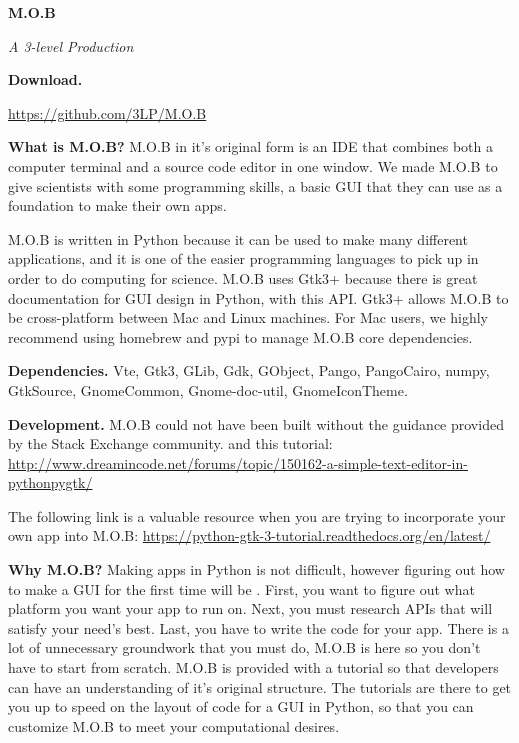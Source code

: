 \documentclass[12pt]{article}
\begin{document}
\begin{center}{\Huge{\textbf{M.O.B}}} \end{center}

\begin{center} \textit{A 3-level Production}\end{center}


\begin{multicols}{2}

\textbf{Download.}

{\footnotesize{\url{https://github.com/3LP/M.O.B}}}

\vspace{0.25cm}

\textbf{What is M.O.B?}  M.O.B in it's original form is an IDE that combines both a computer terminal and a source code editor in one window.  We made M.O.B to give scientists with some programming skills, a basic GUI that they can use as a foundation to make their own apps.

\indent M.O.B is written in Python because it can be used to make many different applications, and it is one of the easier programming languages to pick up in order to do computing for science.  M.O.B uses Gtk3+ because there is great documentation for GUI design in Python, with this API.  Gtk3+ allows M.O.B to be cross-platform between Mac and Linux machines.  For Mac users, we highly recommend using homebrew and pypi to manage M.O.B core dependencies.   


\textbf{Dependencies.} Vte, Gtk3,  GLib, Gdk, GObject, Pango, PangoCairo, numpy, GtkSource, GnomeCommon, Gnome-doc-util, GnomeIconTheme.


\textbf{Development.} M.O.B could not have been built without the guidance provided by the Stack Exchange community. and this tutorial:  {\footnotesize{\url{http://www.dreamincode.net/forums/topic/150162-a-simple-text-editor-in-pythonpygtk/}}}


\indent The following link is a valuable resource when you are trying to incorporate your own app into M.O.B:    {\footnotesize{\url{https://python-gtk-3-tutorial.readthedocs.org/en/latest/}}}
 
 
\textbf{Why M.O.B?}  Making apps in Python is not difficult, however figuring out how to make a GUI for the first time will be .  First, you want to figure out what platform you want your app to run on. Next, you must research APIs that will satisfy your need's best.  Last, you have to write the code for your app.  There is a lot of unnecessary groundwork that you must do, M.O.B is here so you don't have to start from scratch.  M.O.B is provided with a tutorial so that developers can have an understanding of it's original structure.  The tutorials are there to get you up to speed on the layout of code for a GUI in Python, so that you can customize M.O.B to meet your computational desires.  

\end{multicols}
\end{document}
